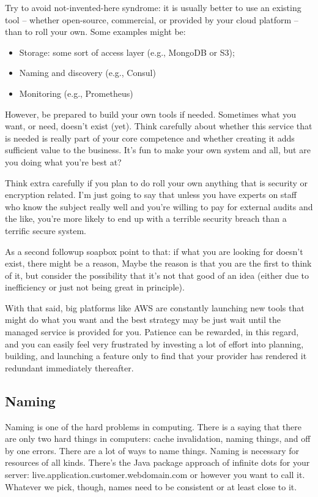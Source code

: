 \documentclass[a4paper]{report}
\begin{document}
Try to avoid not-invented-here syndrome: it is usually better to use an existing tool -- whether open-source, commercial, or provided by your cloud platform -- than to roll your own. Some examples might be:
\begin{itemize}
\item Storage: some sort of access layer (e.g., MongoDB or S3);
\item Naming and discovery (e.g., Consul)
\item Monitoring (e.g., Prometheus)
\end{itemize}

However, be prepared to build your own tools if needed. Sometimes what you want, or need, doesn't exist (yet). Think carefully about whether this service that is needed is really part of your core competence and whether creating it adds sufficient value to the business. It's fun to make your own system and all, but are you doing what you're best at? 

Think extra carefully if you plan to do roll your own anything that is security or encryption related. I'm just going to say that unless you have experts on staff who know the subject really well and you're willing to pay for external audits and the like, you're more likely to end up with a terrible security breach than a terrific secure system. 

As a second followup soapbox point to that: if what you are looking for doesn't exist, there might be a reason, Maybe the reason is that you are the first to think of it, but consider the possibility that it's not that good of an idea (either due to inefficiency or just not being great in principle). 

With that said, big platforms like AWS are constantly launching new tools that might do what you want and the best strategy may be just wait until the managed service is provided for you. Patience can be rewarded, in this regard, and you can easily feel very frustrated by investing a lot of effort into planning, building, and launching a feature only to find that your provider has rendered it redundant immediately thereafter.

\subsection*{Naming}
Naming is one of the hard problems in computing. There is a saying that there are only two hard things in computers: cache invalidation, naming things, and off by one errors.  There are a
lot of ways to name things. Naming is necessary for resources of all kinds. There's the Java package approach of infinite dots for your server: live.application.customer.webdomain.com or however you want to call it. Whatever we pick, though, names need to be consistent or at least close to it.
\end{document}
